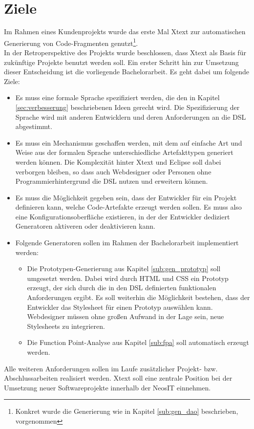 \documentclass[a4paper,12pt]{scrreprt}
\begin{document}
\section{Ziele}
Im Rahmen eines Kundenprojekts wurde das erste Mal Xtext zur automatischen Generierung von Code-Fragmenten genutzt\footnote{Konkret wurde die Generierung wie in Kapitel \ref{sub:gen_dao} beschrieben, vorgenommen}.\\
In der Retroperspektive des Projekts wurde beschlossen, dass Xtext als Basis für zukünftige Projekte benutzt werden soll.
Ein erster Schritt hin zur Umsetzung dieser Entscheidung ist die vorliegende Bachelorarbeit. Es geht dabei um folgende Ziele:
\begin{itemize}
	\item Es muss eine formale Sprache spezifiziert werden, die den in Kapitel
	\ref{sec:verbesserung} beschriebenen Ideen gerecht wird. Die Spezifizierung der Sprache wird mit anderen Entwicklern und deren Anforderungen an die DSL abgestimmt.
	\item Es muss ein Mechanismus geschaffen werden, mit dem auf einfache Art und Weise aus der formalen Sprache unterschiedliche Artefakttypen generiert werden können. Die Komplexität hinter Xtext und Eclipse soll dabei verborgen bleiben, so dass auch Webdesigner oder Personen ohne Programmierhintergrund die DSL nutzen und erweitern können.
	\item Es muss die Möglichkeit gegeben sein, dass der Entwickler für ein Projekt definieren kann, welche Code-Artefakte erzeugt werden sollen. Es muss also eine Konfigurationsoberfläche existieren, in der der Entwickler dediziert Generatoren aktiveren oder deaktivieren kann.\\
	\item Folgende Generatoren sollen im Rahmen der Bachelorarbeit implementiert werden:
		\begin{itemize}
			\item Die Prototypen-Generierung aus Kapitel \ref{sub:gen_prototyp} soll umgesetzt werden. Dabei wird durch HTML und CSS ein Prototyp erzeugt, der sich durch die in den DSL definierten funktionalen Anforderungen ergibt. Es soll weiterhin die Möglichkeit bestehen, dass der Entwickler das Stylesheet für einen Prototyp auswählen kann. Webdesigner müssen ohne großen Aufwand in der Lage sein, neue Stylesheets zu integrieren.
			\item Die Function Point-Analyse aus Kapitel \ref{sub:fpa} soll automatisch erzeugt werden.
		\end{itemize}
\end{itemize}
Alle weiteren Anforderungen sollen im Laufe zusätzlicher Projekt- bzw. Ab\-schluss\-ar\-bei\-ten realisiert werden. Xtext soll eine zentrale Position bei der Umsetzung neuer Softwareprojekte innerhalb der NeosIT einnehmen.
\end{document}
